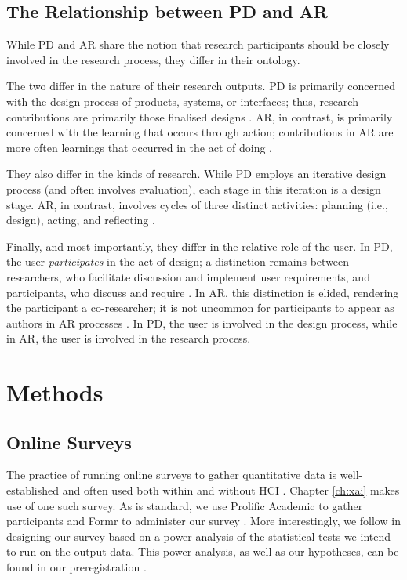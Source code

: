 \subsection{The Relationship between PD and AR}
While PD and AR share the notion that research participants should be closely involved in the research process, they differ in their ontology.

The two differ in the nature of their research outputs. PD is primarily concerned with the design process of products, systems, or interfaces; thus, research contributions are primarily those finalised designs \cite{citation needed}. AR, in contrast, is primarily concerned with the learning that occurs through action; contributions in AR are more often learnings that occurred in the act of doing \cite{Hult1980TOWARDSAD}. 

They also differ in the kinds of research. While PD employs an iterative design process (and often involves evaluation), each stage in this iteration is a design stage. AR, in contrast, involves cycles of three distinct activities: planning (i.e., design), acting, and reflecting \cite{Hult1980TOWARDSAD}.

Finally, and most importantly, they differ in the relative role of the user. In PD, the user \emph{participates} in the act of design; a distinction remains between researchers, who facilitate discussion and implement user requirements, and participants, who discuss and require \cite{Hussain2014OverviewOV}. In AR, this distinction is elided, rendering the participant a co-researcher; it is not uncommon for participants to appear as authors in AR processes \cite{Hayes_2011}. In PD, the user is involved in the design process, while in AR, the user is involved in the research process.

\section{Methods} %
\subsection{Online Surveys}
The practice of running online surveys to gather quantitative data is well-established and often used both within and without HCI \cite{citation needed}. Chapter \ref{ch:xai} makes use of one such survey. As is standard, we use Prolific Academic to gather participants and Formr to administer our survey \cite{citation needed}. More interestingly, we follow \textcite{caldwell_power_nodate} in designing our survey based on a power analysis of the statistical tests we intend to run on the output data. This power analysis, as well as our hypotheses, can be found in our preregistration \cite{natarajan_binns_2022}.

